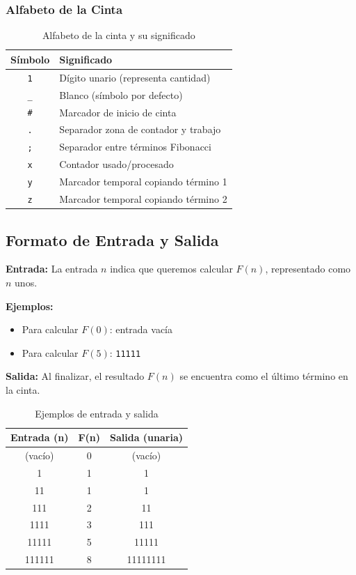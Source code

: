 \documentclass[12pt,a4paper]{article}
\begin{document}
\subsubsection{Alfabeto de la Cinta}

\begin{table}[H]
\centering
\begin{tabular}{cl}
\toprule
\textbf{Símbolo} & \textbf{Significado} \\
\midrule
\texttt{1} & Dígito unario (representa cantidad) \\
\texttt{\_} & Blanco (símbolo por defecto) \\
\texttt{\#} & Marcador de inicio de cinta \\
\texttt{.} & Separador zona de contador y trabajo \\
\texttt{;} & Separador entre términos Fibonacci \\
\texttt{x} & Contador usado/procesado \\
\texttt{y} & Marcador temporal copiando término 1 \\
\texttt{z} & Marcador temporal copiando término 2 \\
\bottomrule
\end{tabular}
\caption{Alfabeto de la cinta y su significado}
\end{table}

\subsection{Formato de Entrada y Salida}

\textbf{Entrada:} La entrada $n$ indica que queremos calcular $F(n)$, representado como $n$ unos.

\textbf{Ejemplos:}
\begin{itemize}
    \item Para calcular $F(0)$: entrada vacía
    \item Para calcular $F(5)$: \texttt{11111}
\end{itemize}

\textbf{Salida:} Al finalizar, el resultado $F(n)$ se encuentra como el último término en la cinta.

\begin{table}[H]
\centering
\begin{tabular}{ccc}
\toprule
\textbf{Entrada (n)} & \textbf{F(n)} & \textbf{Salida (unaria)} \\
\midrule
(vacío) & 0 & (vacío) \\
1 & 1 & 1 \\
11 & 1 & 1 \\
111 & 2 & 11 \\
1111 & 3 & 111 \\
11111 & 5 & 11111 \\
111111 & 8 & 11111111 \\
\bottomrule
\end{tabular}
\caption{Ejemplos de entrada y salida}
\end{table}
\end{document}
